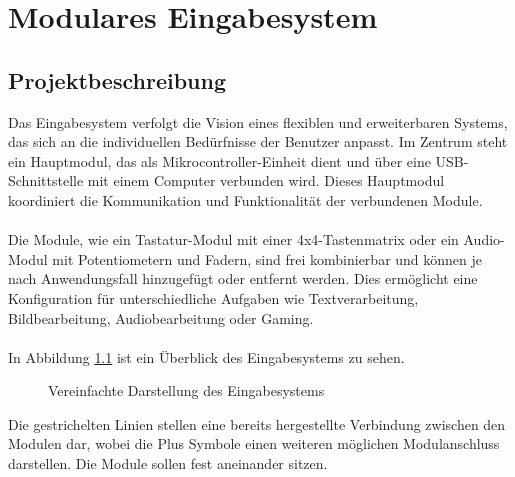 \chapter{Modulares Eingabesystem}
\section{Projektbeschreibung}\label{sec:vision}
Das Eingabesystem verfolgt die Vision eines flexiblen und erweiterbaren Systems, das sich an die individuellen Bedürfnisse der Benutzer anpasst. Im Zentrum steht ein Hauptmodul, das als Mikrocontroller-Einheit dient und über eine USB-Schnittstelle mit einem Computer verbunden wird. Dieses Hauptmodul koordiniert die Kommunikation und Funktionalität der verbundenen Module.
\\
\\
Die Module, wie ein Tastatur-Modul mit einer 4x4-Tastenmatrix oder ein Audio-Modul mit Potentiometern und Fadern, sind frei kombinierbar und können je nach Anwendungsfall hinzugefügt oder entfernt werden. Dies ermöglicht eine Konfiguration für unterschiedliche Aufgaben wie Textverarbeitung, Bildbearbeitung, Audiobearbeitung oder Gaming.
\\
\\
In Abbildung \ref{vision} ist ein Überblick des Eingabesystems zu sehen.
\begin{figure}[H]
    \centering    
    \caption{Vereinfachte Darstellung des Eingabesystems}
    \label{vision}
\end{figure}
\noindent Die gestrichelten Linien stellen eine bereits hergestellte Verbindung zwischen den Modulen dar, wobei die \glqq Plus\grqq{} Symbole einen weiteren möglichen Modulanschluss darstellen. Die Module sollen fest aneinander sitzen.

